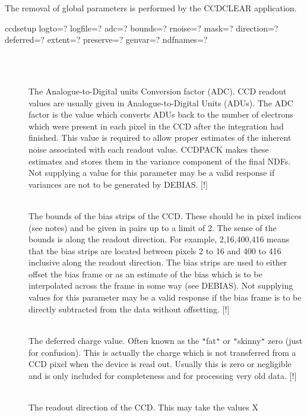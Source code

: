 \documentclass[twoside,11pt]{article}
\newcommand{\htmlref}[2]{#1}
\newcommand{\xlabel}[1]{}
\renewcommand{\_}{\texttt{\symbol{95}}}
\newcommand{\qt}[1]{{\tt "}#1{\tt "}}
\newcommand{\xroutine}[1]{\htmlref{{\sc #1}}{#1}}
\newcommand{\sstusage}[1]{\item[Usage:] \mbox{}
   \begin{description}
      {\ssttt \item #1}
   \end{description}
}
\newcommand{\sstparameters}[1]{
   \item[Parameters:] \mbox{} \\
   \vspace{-3.5ex}
   \begin{description}
      #1
   \end{description}
}
\newcommand{\sstsubsection}[1]{ \item[{#1}] \mbox{} \\}
\newcommand{\sstusage}[1]{\item[Usage:]
      \begin{description}
         {\ssttt #1}
      \end{description}
      \\
   }
\newcommand{\sstparameters}[1]{
      \item[Parameters:] \\
      \begin{description}
         #1
      \end{description}
      \\
   }
\newcommand{\sstsubsection}[1]{\item[{#1}]}
\begin{document}
{{      The removal of global parameters is performed by the \xroutine{CCDCLEAR}
      application.
   }
   \sstusage{
      ccdsetup logto=? logfile=? adc=? bounds=? rnoise=? mask=?
               direction=? deferred=? extent=? preserve=? genvar=?
               ndfnames=?
   }
   \sstparameters{
      \sstsubsection{
         \xlabel{CCDADC}
         ADC = \_DOUBLE (Read and Write)
      } {
         The Analogue-to-Digital units Conversion factor (ADC). CCD
         readout values are usually given in Analogue-to-Digital Units
         (ADUs). The ADC factor is the value which converts ADUs back
         to the number of electrons which were present in each pixel in
         the CCD after the integration had finished. This value is
         required to allow proper estimates of the inherent noise
         associated with each readout value. CCDPACK makes these
         estimates and stores them in the variance component of the
         final NDFs. Not supplying a value for this parameter may be a
         valid response if variances are not to be generated by \xroutine{DEBIAS}.
         [!]
      }
      \sstsubsection{
         \xlabel{CCDbounds}
         BOUNDS( 2 or 4 ) = \_INTEGER (Read and Write)
      } {
         The bounds of the bias strips of the CCD. These should be in
         pixel indices (see notes) and be given in pairs up to a limit
         of 2. The sense of the bounds is along the readout direction.
         For example, 2,16,400,416 means that the bias strips are
         located between pixels 2 to 16 and 400 to 416 inclusive along
         the readout direction. The bias strips are used to either
         offset the bias frame or as an estimate of the bias which is to
         be interpolated across the frame in some way (see \xroutine{DEBIAS}). Not
         supplying values for this parameter may be a valid response if
         the bias frame is to be directly subtracted from the data
         without offsetting.
         [!]
      }
      \sstsubsection{
         \xlabel{CCDdeferred}
         DEFERRED = \_DOUBLE (Read and Write)
      } {
         The deferred charge value. Often known as the \qt{fat} or \qt{skinny}
         zero (just for confusion). This is actually the charge which is
         not transferred from a CCD pixel when the device is read out.
         Usually this is zero or negligible and is only included for
         completeness and for processing very old data.
         [!]
      }
      \sstsubsection{
         \xlabel{CCDdirection}
         DIRECTION = LITERAL (Read and Write)
      } {
         The readout direction of the CCD. This may take the values X
}}}
\end{document}
